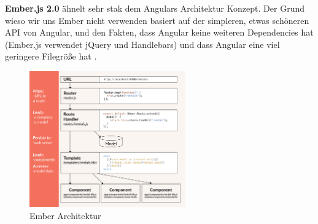 \textbf{Ember.js 2.0} ähnelt sehr stak dem Angulars Architektur Konzept. Der Grund wieso wir uns Ember nicht verwenden basiert auf der simpleren, etwas schöneren API von Angular, und den Fakten, dass Angular keine weiteren Dependencies hat (Ember.js verwendet jQuery und Handlebars) und dass Angular eine viel geringere Filegröße hat \cite{MELD.CH3-web-app.ember}.

\begin{figure}[!htb]\centering
	\includegraphics[width=0.6\textwidth]{images/ember}
	\caption{Ember Architektur \cite{MELD.CH3-web-app.ember}}
\end{figure}

\clearpage

